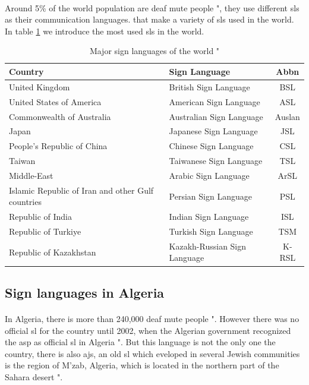 \paragraph{}
Around 5\% of the world population are deaf mute people "\cite{5perc}, they use different \ac{sl}s as their communication languages. that make a variety of \ac{sl}s used in the world. In table \ref{tab:major-sign-languages-of-the-world} we introduce the most used \ac{sl}s in the world.
\begin{table}[h]
	\caption{Major sign languages of the world "\cite{5perc}}
	\label{tab:major-sign-languages-of-the-world}
	\begin{tabular}{|l|l|c|}
		\hline
		\textbf{Country}  & \textbf{Sign Language} & \textbf{Abbn} \\
		\hline
		United Kingdom & British Sign Language & BSL \\
		\hline
		United States of America & American Sign Language & ASL \\
		\hline
		Commonwealth of Australia & Australian Sign Language & Auslan \\
		\hline
		Japan & Japanese Sign Language & JSL \\
		\hline
		People's Republic of China & Chinese Sign Language & CSL \\
		\hline
		Taiwan & Taiwanese Sign Language & TSL \\
		\hline
		Middle-East & Arabic Sign Language & ArSL \\
		\hline
		Islamic Republic of Iran and other Gulf countries & Persian Sign Language & PSL \\
		\hline
		Republic of India & Indian Sign Language & ISL \\
		\hline
		Republic of Turkiye & Turkish Sign Language & TSM \\
		\hline
		Republic of Kazakhstan & Kazakh-Russian Sign Language & K-RSL \\
		\hline
	\end{tabular}
\end{table}
\subsection{Sign languages in Algeria}
\paragraph{}
In Algeria, there is more than 240,000 deaf mute people "\cite{ethnologue}. However there was no official \ac{sl} for the country until 2002, when the Algerian government  recognized the \ac{asp} as official \ac{sl} in Algeria "\cite{wiki}. But this language is not the only one the country, there is also \ac{ajs}, an old \ac{sl} which eveloped in several Jewish communities is the region of M'zab, Algeria, which is located in the northern part of the Sahara desert "\cite{sara}.
